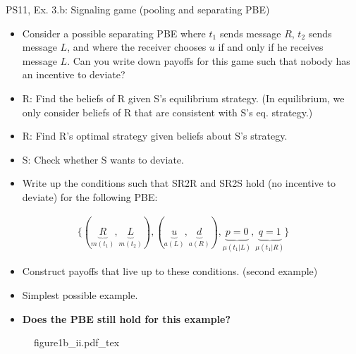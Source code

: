 \begin{frame}{PS11, Ex. 3.b: Signaling game (pooling and separating PBE)}
    \begin{itemize}
        \item[(b)] Consider a possible separating PBE where $t_1$ sends message $R$, $t_2$ sends message $L$, and where the receiver chooses $u$ if and only if he receives message $L$. Can you write down payoffs for this game such that nobody has an incentive to deviate?
    \end{itemize} \vspace{-8pt}
    \begin{multicols}{2}
      \begin{itemize}
        \item[SR3:] R: Find the beliefs of R given S's equilibrium strategy. (In equilibrium, we only consider beliefs of R that are consistent with S's eq. strategy.)
        \item[SR2R:] R: Find R's optimal strategy given beliefs about S's strategy.
        \item[SR2S:] S: Check whether S wants to deviate.
        \item[PBE:]  Write up the conditions such that SR2R and SR2S hold (no incentive to deviate) for the following PBE:
      \end{itemize}\vspace{-15pt}
      \begin{align*}
        \{(\underbrace{R}_{m(t_1)},\underbrace{L}_{m(t_2)}),(\underbrace{u}_{a(L)},\underbrace{d}_{a(R)}),\underbrace{p=0}_{\mu(t_1|L)},\underbrace{q=1}_{\mu(t_1|R)}\}
      \end{align*}\vspace{-16pt}
      \begin{itemize}
        \item[$\rightarrow$] Construct payoffs that live up to these conditions. (second example)
        \item[i:] \vspace{-1pt}Simplest possible example.
        \item[ii:] \vspace{-1pt}\textbf{Does the PBE still hold for this example?}
      \end{itemize}
      \vfill\null\columnbreak
      \begin{figure}[!h]
        \center{}
        {figure1b_ii.pdf_tex}
      \end{figure} \vspace{-8pt}

\end{multicols}
\end{frame}
